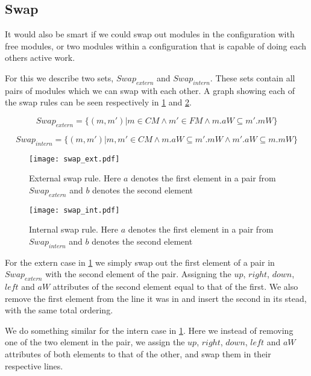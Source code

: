 \subsection{Swap}
It would also be smart if we could swap out modules in the configuration with free modules, or two modules within a configuration that is capable of doing each others active work.

For this we describe two sets, $Swap_{extern}$ and $Swap_{intern}$. These sets contain all pairs of modules which we can swap with each other. A graph showing each of the swap rules can be seen respectively in \cref{fig:swap_ext} and \cref{fig:swap_int}.

\[Swap_{extern} = \{(m, m') | m \in CM \land m' \in FM \land m.aW \subseteq m'.mW \}\]

\[Swap_{intern} = \{(m, m') | m, m' \in CM \land m.aW \subseteq m'.mW \land m'.aW \subseteq m.mW \}\]

\begin{figure}[h]
\centering
\texttt{[image: swap\_ext.pdf]}
\caption{External swap rule. Here $a$ denotes the first element in a pair from $Swap_{extern}$ and $b$ denotes the second element}
\label{fig:swap_ext}
\end{figure}

\begin{figure}[h]
\centering
\texttt{[image: swap\_int.pdf]}
\caption{Internal swap rule. Here $a$ denotes the first element in a pair from $Swap_{intern}$ and $b$ denotes the second element}
\label{fig:swap_int}
\end{figure}

For the extern case in \cref{fig:swap_ext} we simply swap out the first element of a pair in $Swap_{extern}$ with the second element of the pair. Assigning the $up$, $right$, $down$, $left$ and $aW$ attributes of the second element equal to that of the first. We also remove the first element from the line it was in and insert the second in its stead, with the same total ordering.

We do something similar for the intern case in \cref{fig:swap_ext}. Here we instead of removing one of the two element in the pair, we assign the $up$, $right$, $down$, $left$ and $aW$ attributes of both elements to that of the other, and swap them in their respective lines.

